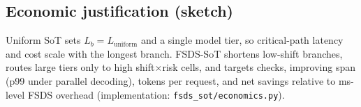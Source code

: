 \subsection{Economic justification (sketch)}
\label{sec:econ}

Uniform SoT sets $L_b=L_{\mathrm{uniform}}$ and a single model tier, so critical-path
latency and cost scale with the longest branch. FSDS-SoT shortens low-shift
branches, routes large tiers only to high shift$\times$risk cells, and targets
checks, improving span (p99 under parallel decoding), tokens per request, and
net savings relative to ms-level FSDS overhead (implementation:
\texttt{fsds\_sot/economics.py}).
